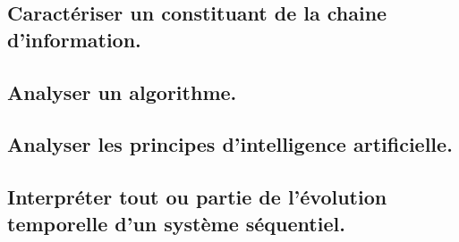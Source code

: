 \documentclass[10pt,fleqn]{article}
\newcommand{\repRel}{../..}
\newcommand{\repStyle}{\repRel/Style}
\newcommand{\td}{fichier_td}
\newcommand{\repExos}{\repRel/ExercicesCompetences}
\newcommand{\repExo}{dossier}
\begin{document}
\begin{multicols}{2} 

\end{multicols}

\subsection{Caractériser un constituant de la chaine d’information.} 

\begin{multicols}{2} 

\renewcommand{\repExo}{\repExos/A3_AnalyseFonctionnelleStructurelle/A3_06_ChaineInfo/507_Divers}
\renewcommand{\td}{507_Divers}
\graphicspath{{\repStyle/png/}{\repExo/images/}}


\renewcommand{\repExo}{\repExos/A3_AnalyseFonctionnelleStructurelle/A3_06_ChaineInfo/50_BancBalafre}
\renewcommand{\td}{50_BancBalafre}
\graphicspath{{\repStyle/png/}{\repExo/images/}}


\renewcommand{\repExo}{\repExos/A3_AnalyseFonctionnelleStructurelle/A3_06_ChaineInfo/538_Codeur}
\renewcommand{\td}{538_Codeur}
\graphicspath{{\repStyle/png/}{\repExo/images/}}


\end{multicols}

\subsection{Analyser un algorithme. } 

\begin{multicols}{2} 

\end{multicols}

\subsection{Analyser les principes d'intelligence artificielle. } 

\begin{multicols}{2} 

\end{multicols}

\subsection{Interpréter tout ou partie de l’évolution temporelle d’un système séquentiel.} 
\end{document}
